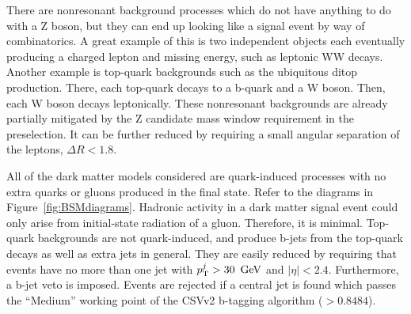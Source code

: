 There are nonresonant background processes which do not have anything to do with a Z boson,
but they can end up looking like a signal event by way of combinatorics.
A great example of this is two independent objects each eventually producing a charged lepton and missing energy, such as leptonic WW decays.
Another example is top-quark backgrounds such as the ubiquitous ditop production.
There, each top-quark decays to a b-quark and a W boson. Then, each W boson decays leptonically.
These nonresonant backgrounds are already partially mitigated by the Z candidate mass window requirement in the preselection.
It can be further reduced by requiring a small angular separation of the leptons, $\Delta R < 1.8$.

All of the dark matter models considered are quark-induced processes 
with no extra quarks or gluons produced in the final state.
Refer to the diagrams in Figure~\ref{fig:BSMdiagrams}.
Hadronic activity in a dark matter signal event could only arise 
from initial-state radiation of a gluon. Therefore, it is minimal.
Top-quark backgrounds are not quark-induced, and produce b-jets from the top-quark decays as well as extra jets in general.
They are easily reduced by requiring that events have no more than one jet with $p_{\mathrm{T}}^{j} > 30~\,\text{Ge\hspace{-.08em}V}$ and $|\eta|<2.4$.
Furthermore, a b-jet veto is imposed.
Events are rejected if a central jet is found which passes the ``Medium'' working point of the CSVv2 b-tagging algorithm ($>0.8484$).


